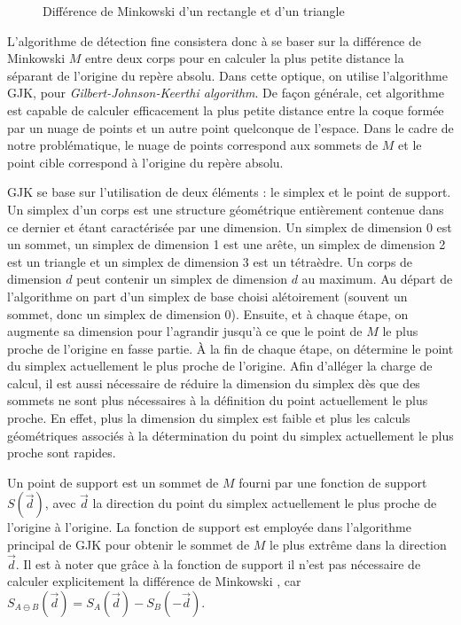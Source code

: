 \begin{figure}
  \centering
  \subfloat[]{  }
  \subfloat[]{  }
  \caption{Différence de Minkowski d'un rectangle et d'un triangle}
  \label{minkowski}
\end{figure}

L'algorithme de détection fine consistera donc à se baser sur la
différence de Minkowski $M$ entre deux corps pour en calculer la plus
petite distance la séparant de l'origine du repère absolu. Dans cette
optique, on utilise l'algorithme GJK, pour
\textit{Gilbert-Johnson-Keerthi algorithm}. De façon générale, cet
algorithme est capable de calculer efficacement la plus petite
distance entre la coque formée par un nuage de points et un autre
point quelconque de l'espace. Dans le cadre de notre problématique, le
nuage de points correspond aux sommets de $M$ et le point cible
correspond à l'origine du repère absolu.

GJK se base sur l'utilisation de deux éléments : le simplex et le
point de support. Un simplex d'un corps est une structure géométrique
entièrement contenue dans ce dernier et étant caractérisée par une
dimension. Un simplex de dimension 0 est un sommet, un simplex de
dimension 1 est une arête, un simplex de dimension 2 est un triangle
et un simplex de dimension 3 est un tétraèdre. Un corps de dimension
$d$ peut contenir un simplex de dimension $d$ au maximum. Au départ de
l'algorithme on part d'un simplex de base choisi alétoirement (souvent
un sommet, donc un simplex de dimension 0). Ensuite, et à chaque
étape, on augmente sa dimension pour l'agrandir jusqu'à ce que le
point de $M$ le plus proche de l'origine en fasse partie. \`A la fin
de chaque étape, on détermine le point du simplex actuellement le plus
proche de l'origine. Afin d'alléger la charge de calcul, il est aussi
nécessaire de réduire la dimension du simplex dès que des sommets ne
sont plus nécessaires à la définition du point actuellement le plus
proche. En effet, plus la dimension du simplex est faible et plus les
calculs géométriques associés à la détermination du point du simplex
actuellement le plus proche sont rapides.

Un point de support est un sommet de $M$ fourni par une fonction de
support $S(\vec{d})$, avec $\vec{d}$ la direction du point du simplex
actuellement le plus proche de l'origine à l'origine. La fonction de
support est employée dans l'algorithme principal de GJK pour obtenir
le sommet de $M$ le plus extrême dans la direction $\vec{d}$. Il est à
noter que grâce à la fonction de support il n'est pas nécessaire de
calculer explicitement la différence de Minkowski \cite{ericson}, car
$S_{A \ominus B}(\vec{d}) = S_A(\vec{d}) - S_B(-\vec{d})$.

